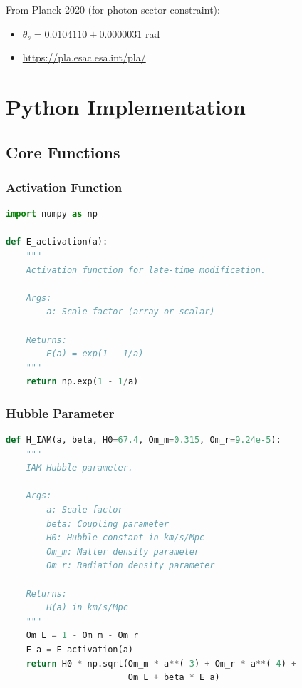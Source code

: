 \documentclass[11pt]{article}
\begin{document}
From Planck 2020 (for photon-sector constraint):
\begin{itemize}
    \item $\theta_s = 0.0104110 \pm 0.0000031$ rad
    \item \url{https://pla.esac.esa.int/pla/}
\end{itemize}

\section{Python Implementation}

\subsection{Core Functions}

\subsubsection{Activation Function}

\begin{lstlisting}[language=Python]
import numpy as np

def E_activation(a):
    """
    Activation function for late-time modification.
    
    Args:
        a: Scale factor (array or scalar)
    
    Returns:
        E(a) = exp(1 - 1/a)
    """
    return np.exp(1 - 1/a)
\end{lstlisting}

\subsubsection{Hubble Parameter}

\begin{lstlisting}[language=Python]
def H_IAM(a, beta, H0=67.4, Om_m=0.315, Om_r=9.24e-5):
    """
    IAM Hubble parameter.
    
    Args:
        a: Scale factor
        beta: Coupling parameter
        H0: Hubble constant in km/s/Mpc
        Om_m: Matter density parameter
        Om_r: Radiation density parameter
    
    Returns:
        H(a) in km/s/Mpc
    """
    Om_L = 1 - Om_m - Om_r
    E_a = E_activation(a)
    return H0 * np.sqrt(Om_m * a**(-3) + Om_r * a**(-4) + 
                        Om_L + beta * E_a)
\end{lstlisting}
\end{document}
